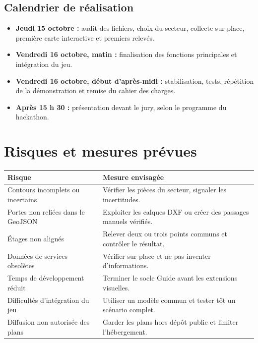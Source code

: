 \documentclass[11pt,a4paper]{article}
\begin{document}
\subsection{Calendrier de réalisation}
\begin{itemize}
\item \textbf{Jeudi 15 octobre :} audit des fichiers, choix du secteur, collecte sur place, première carte interactive et premiers relevés.
\item \textbf{Vendredi 16 octobre, matin :} finalisation des fonctions principales et intégration du jeu.
\item \textbf{Vendredi 16 octobre, début d'après-midi :} stabilisation, tests, répétition de la démonstration et remise du cahier des charges.
\item \textbf{Après 15 h 30 :} présentation devant le jury, selon le programme du hackathon.
\end{itemize}

\section{Risques et mesures prévues}
\begin{longtable}{p{}p{}}
\toprule Risque & Mesure envisagée \\ \midrule
Contours incomplets ou incertains & Vérifier les pièces du secteur, signaler les incertitudes.\\
Portes non reliées dans le GeoJSON & Exploiter les calques DXF ou créer des passages manuels vérifiés.\\
Étages non alignés & Relever deux ou trois points communs et contrôler le résultat.\\
Données de services obsolètes & Vérifier sur place et ne pas inventer d'informations.\\
Temps de développement réduit & Terminer le socle Guide avant les extensions visuelles.\\
Difficultés d'intégration du jeu & Utiliser un modèle commun et tester tôt un scénario complet.\\
Diffusion non autorisée des plans & Garder les plans hors dépôt public et limiter l'hébergement.\\
\bottomrule
\end{longtable}
\end{document}
